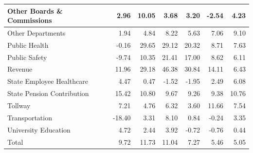 \documentclass[
  letterpaper,
  DIV=11,
  numbers=noendperiod]{scrreport}
\begin{document}
\begin{table}
\begin{tabular}[t]{l|r|r|r|r|r|r}
\hline
Other Boards \& Commissions & 2.96 & 10.05 & 3.68 & 3.20 & -2.54 & 4.23\\
\hline
Other Departments & 1.94 & 4.84 & 8.22 & 5.63 & 7.06 & 9.10\\
\hline
Public Health & -0.16 & 29.65 & 29.12 & 20.32 & 8.71 & 7.63\\
\hline
Public Safety & -9.74 & 10.35 & 21.41 & 17.00 & 8.62 & 6.11\\
\hline
Revenue & 11.96 & 29.18 & 46.38 & 30.84 & 14.11 & 6.43\\
\hline
State Employee Healthcare & 4.47 & 0.47 & -1.52 & -1.95 & 2.49 & 6.08\\
\hline
State Pension Contribution & 15.42 & 10.80 & 9.67 & 9.26 & 9.38 & 10.76\\
\hline
Tollway & 7.21 & 4.76 & 6.32 & 3.60 & 11.66 & 7.54\\
\hline
Transportation & -18.40 & 3.31 & 8.10 & 0.84 & -0.24 & 3.35\\
\hline
University Education & 4.72 & 2.44 & 3.92 & -0.72 & -0.76 & 0.44\\
\hline
Total & 9.72 & 11.73 & 11.04 & 7.27 & 5.46 & 5.05\\
\hline
\end{tabular}
\end{table}
\end{document}
